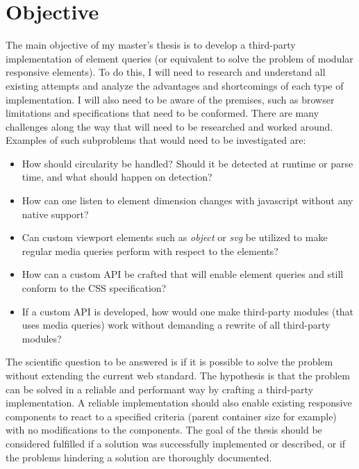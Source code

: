 \documentclass[oneside,a4paper,11pt]{kth-mag}
\begin{document}
\section*{Objective}
The main objective of my master's thesis is to develop a third-party implementation of element queries (or equivalent to solve the problem of modular responsive elements). To do this, I will need to research and understand all existing attempts and analyze the advantages and shortcomings of each type of implementation. I will also need to be aware of the premises, such as browser limitations and specifications that need to be conformed. There are many challenges along the way that will need to be researched and worked around. Examples of such subproblems that would need to be investigated are:
\begin{itemize}
\item How should circularity be handled? Should it be detected at runtime or parse time, and what should happen on detection?
\item How can one listen to element dimension changes with javascript without any native support?
\item Can custom viewport elements such as \emph{object} or \emph{svg} be utilized to make regular media queries perform with respect to the elements?
\item How can a custom API be crafted that will enable element queries and still conform to the CSS specification?
\item If a custom API is developed, how would one make third-party modules (that uses media queries) work without demanding a rewrite of all third-party modules?
\end{itemize}
The scientific question to be answered is if it is possible to solve the problem without extending the current web standard. The hypothesis is that the problem can be solved in a reliable and performant way by crafting a third-party implementation. A reliable implementation should also enable existing responsive components to react to a specified criteria (parent container size for example) with no modifications to the components. The goal of the thesis should be considered fulfilled if a solution was successfully implemented or described, or if the problems hindering a solution are thoroughly documented.


\end{document}
